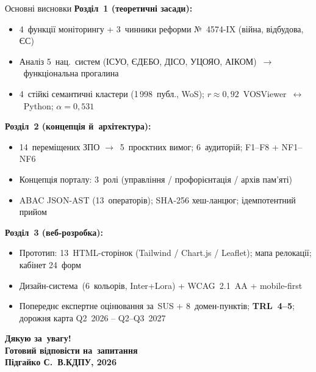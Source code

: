 \documentclass[14pt,aspectratio=169]{beamer}
\begin{document}
\begin{frame}{Основні висновки}
\textbf{Розділ~1 (теоретичні засади):}
\begin{itemize}\footnotesize
\item 4~функції моніторингу + 3~чинники реформи №~4574-IX (війна, відбудова, ЄС)
\item Аналіз 5~нац.\ систем (ІСУО, ЄДЕБО, ДІСО, УЦОЯО, АІКОМ)~$\to$~функціональна прогалина
\item 4~стійкі семантичні кластери (1\,998~публ., WoS); $r\approx 0{,}92$~VOSViewer~$\leftrightarrow$~Python; $\alpha=0{,}531$
\end{itemize}
\textbf{Розділ~2 (концепція й~архітектура):}
\begin{itemize}\footnotesize
\item 14~переміщених ЗПО $\to$~5~проєктних вимог; 6~аудиторій; F1--F8 + NF1--NF6
\item Концепція порталу: 3~ролі (управління / профорієнтація / архів пам'яті)
\item ABAC JSON-AST (13~операторів); SHA-256 хеш-ланцюг; ідемпотентний прийом
\end{itemize}
\textbf{Розділ~3 (веб-розробка):}
\begin{itemize}\footnotesize
\item Прототип: 13~HTML-сторінок (Tailwind / Chart.js / Leaflet); мапа релокації; кабінет 24~форм
\item Дизайн-система~(6~кольорів, Inter+Lora) + WCAG~2.1~AA + mobile-first
\item Попереднє експертне оцінювання за~SUS + 8~домен-пунктів; \textbf{TRL~4--5}; дорожня карта Q2~2026 -- Q2--Q3~2027
\end{itemize}
\end{frame}

\begin{frame}
\centering
\Huge\bfseries Дякую за~увагу!\\[0.6em]
\large\normalfont Готовий відповісти на~запитання
\\[1em]
\small Підгайко С.~В.\quad\textbar\quad КДПУ, 2026
\end{frame}
\end{document}
